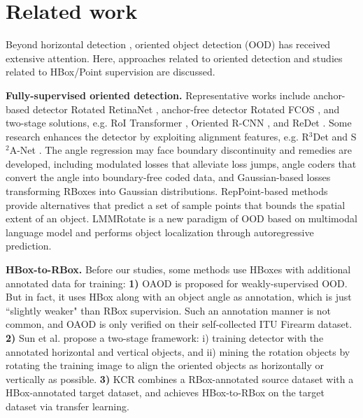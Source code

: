 \section{Related work}
\label{sec:work}

Beyond horizontal detection \cite{Zhao2019Object, liu2020deep,zheng2024zone}, oriented object detection (OOD) \cite{wen2023comprehensive} has received extensive attention. Here, approaches related to oriented detection and studies related to HBox/Point supervision are discussed.

\textbf{Fully-supervised oriented detection.} Representative works include anchor-based detector Rotated RetinaNet \cite{Lin2017Focal}, anchor-free detector Rotated FCOS \cite{Tian2019FCOS}, and two-stage solutions, e.g. RoI Transformer \cite{Ding2018Learning}, Oriented R-CNN \cite{Xie2021Oriented}, and ReDet \cite{Han2021Redet}. Some research enhances the detector by exploiting alignment features, e.g. R$^3$Det \cite{Yang2021R3Det} and S$^2$A-Net \cite{Han2022Align}. The angle regression may face boundary discontinuity and remedies are developed, including modulated losses \cite{Yang2019SCRDet, Qian2021RSDet} that alleviate loss jumps, angle coders \cite{Yang2020Arbitrary, Yang2021Dense, yu2024boundary} that convert the angle into boundary-free coded data, and Gaussian-based losses \cite{Yang2021Rethinking, Yang2021Learning, yang2023detecting, yang2023kfiou} transforming RBoxes into Gaussian distributions. RepPoint-based methods \cite{Yang2019Reppoints, hou2022grep, li2022oriented} provide alternatives that predict a set of sample points that bounds the spatial extent of an object. LMMRotate \cite{li2025simple} is a new paradigm of OOD based on multimodal language model and performs object localization through autoregressive prediction.

\textbf{HBox-to-RBox.} 
Before our studies, some methods use HBoxes with additional annotated data for training: \textbf{1)} OAOD \cite{iqbal2021leveraging} is proposed for weakly-supervised OOD. But in fact, it uses HBox along with an object angle as annotation, which is just ``slightly weaker" than RBox supervision. Such an annotation manner is not common, and OAOD is only verified on their self-collected ITU Firearm dataset. 
\textbf{2)} Sun et al. \cite{sun2021oriented} propose a two-stage framework: i) training detector with the annotated horizontal and vertical objects, and ii) mining the rotation objects by rotating the training image to align the oriented objects as horizontally or vertically as possible.
\textbf{3)} KCR \cite{zhu2023knowledge} combines a RBox-annotated source dataset with a HBox-annotated target dataset, and achieves HBox-to-RBox on the target dataset via transfer learning.


